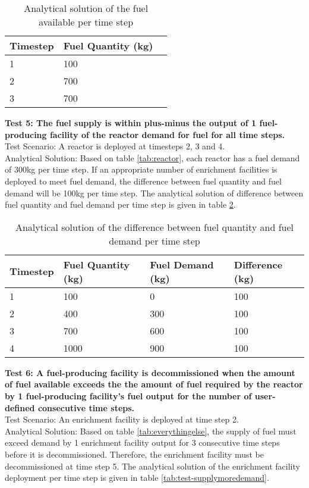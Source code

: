 \documentclass[11pt,letterpaper]{article}
\begin{document}
\begin{table}[H]
     \centering
    \begin{tabularx}{\textwidth}{bbb}
       \hline
       Timestep & Fuel Quantity (kg)  \\
       \hline
       1 & 100 \\
       2 & 700 \\
       3 & 700\\
       \hline
    \end{tabularx}
    \caption {Analytical solution of the fuel available per time step}
    \label{tab:test-fueldemand}
\end{table}

\noindent
\textbf{Test 5: The fuel supply is within plus-minus the output of 1 fuel-producing facility of the reactor demand for fuel for all time steps.} \\
Test Scenario: A reactor is deployed at timesteps 2, 3 and 4.\\
Analytical Solution: Based on table \ref{tab:reactor}, each reactor has a fuel demand of 300kg per time step. If an appropriate number of enrichment facilities is deployed to meet fuel demand, the difference between fuel quantity and fuel demand will be 100kg per time step. The analytical solution of difference between fuel quantity and fuel demand per time step is given in table \ref{tab:test-fueldiff}.  

\begin{table}[H]
     \centering
    \begin{tabularx}{\textwidth}{bbbb}
       \hline
       Timestep & Fuel Quantity (kg) & Fuel Demand (kg) & Difference (kg)\\
       \hline
       1 & 100 & 0 &100\\
       2 & 400 & 300 &100\\
       3 & 700 & 600 &100\\
       4 & 1000 & 900 &100\\
       \hline
    \end{tabularx}
    \caption {Analytical solution of the difference between fuel quantity and fuel demand per time step}
    \label{tab:test-fueldiff}
\end{table}

\noindent
\textbf{Test 6: A fuel-producing facility is decommissioned when the amount of fuel available exceeds the the amount of fuel required by the reactor by 1 fuel-producing facility's fuel output for the number of user-defined consecutive time steps.} \\
Test Scenario: An enrichment facility is deployed at time step 2. \\
Analytical Solution: Based on table \ref{tab:everythingelse}, the supply of fuel must exceed demand by 1 enrichment facility output for 3 consecutive time steps before it is decommissioned. Therefore, the enrichment facility must be decommissioned at time step 5. The analytical solution of the enrichment facility deployment per time step is given in table \ref{tab:test-supplymoredemand}. 
\end{document}
